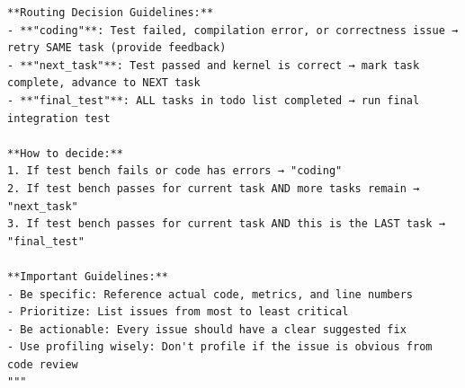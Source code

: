 \begin{tcolorbox}[mybox, title={Prompts for Verifier}]
\begin{verbatim}
**Routing Decision Guidelines:**
- **"coding"**: Test failed, compilation error, or correctness issue → retry SAME task (provide feedback)
- **"next_task"**: Test passed and kernel is correct → mark task complete, advance to NEXT task
- **"final_test"**: ALL tasks in todo list completed → run final integration test

**How to decide:**
1. If test bench fails or code has errors → "coding"
2. If test bench passes for current task AND more tasks remain → "next_task"
3. If test bench passes for current task AND this is the LAST task → "final_test"

**Important Guidelines:**
- Be specific: Reference actual code, metrics, and line numbers
- Prioritize: List issues from most to least critical
- Be actionable: Every issue should have a clear suggested fix
- Use profiling wisely: Don't profile if the issue is obvious from code review
"""
\end{verbatim}
\normalfont
\end{tcolorbox}





